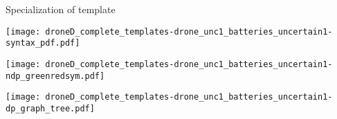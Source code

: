\documentclass{article}
\newcommand{\includeA}[1]{
    \texttt{[image: \#1]}
}
\newcommand{\panelsA}[1]{
    \begin{figure}[h!]
        \texttt{[image: \#1-syntax\_pdf.pdf]}

    \texttt{[image: \#1-ndp\_graph\_enclosed.png]}

        \texttt{[image: \#1-ndp\_greenredsym.pdf]}

        \texttt{[image: \#1-dp\_graph\_flow.pdf]}
        
        \texttt{[image: \#1-dp\_graph\_tree.pdf]}
        
    \end{figure}
}
\begin{document}

\FloatBarrier
\clearpage

Specialization of template 

\texttt{[image: droneD\_complete\_templates-drone\_unc1\_batteries\_uncertain1-syntax\_pdf.pdf]}

\texttt{[image: droneD\_complete\_templates-drone\_unc1\_batteries\_uncertain1-ndp\_greenredsym.pdf]}

\texttt{[image: droneD\_complete\_templates-drone\_unc1\_batteries\_uncertain1-dp\_graph\_tree.pdf]}

\FloatBarrier
\clearpage











\end{document}
